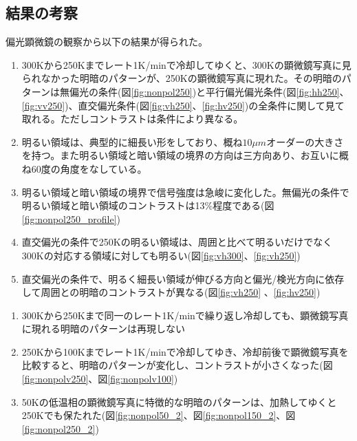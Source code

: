 \subsection{結果の考察}
偏光顕微鏡の観察から以下の結果が得られた。
\begin{description}
\item[300Kと250Kの偏光顕微鏡像の比較]
\item
\begin{enumerate}
\item 300Kから250Kまでレート1K/minで冷却してゆくと、300Kの顕微鏡写真に見られなかった明暗のパターンが、250Kの顕微鏡写真に現れた。その明暗のパターンは無偏光の条件(図\ref{fig:nonpol250})と平行偏光偏光条件(図\ref{fig:hh250}、\ref{fig:vv250})、直交偏光条件(図\ref{fig:vh250}、\ref{fig:hv250})の全条件に関して見て取れる。ただしコントラストは条件により異なる。
\item 明るい領域は、典型的に細長い形をしており、概ね$10 \mu m$オーダーの大きさを持つ。また明るい領域と暗い領域の境界の方向は三方向あり、お互いに概ね60度の角度をなしている。
\item 明るい領域と暗い領域の境界で信号強度は急峻に変化した。無偏光の条件で明るい領域と暗い領域のコントラストは13\%程度である(図\ref{fig:nonpol250_profile})
\item 直交偏光の条件で250Kの明るい領域は、周囲と比べて明るいだけでなく300Kの対応する領域に対しても明るい(図\ref{fig:vh300}、\ref{fig:vh250})
\item 直交偏光の条件で、明るく細長い領域が伸びる方向と偏光/検光方向に依存して周囲との明暗のコントラストが異なる(図\ref{fig:vh250} 、\ref{fig:hv250})
 \end{enumerate}
\item[250Kと50Kの偏光顕微鏡像の比較]
\item 
\begin{enumerate}
\item 300Kから250Kまで同一のレート1K/minで繰り返し冷却しても、顕微鏡写真に現れる明暗のパターンは再現しない
\item 250Kから100Kまでレート1K/minで冷却してゆき、冷却前後で顕微鏡写真を比較すると、明暗のパターンが変化し、コントラストが小さくなった(図\ref{fig:nonpolv250}、図\ref{fig:nonpolv100})
\item 50Kの低温相の顕微鏡写真に特徴的な明暗のパターンは、加熱してゆくと250Kでも保たれた(図\ref{fig:nonpol50_2}、図\ref{fig:nonpol150_2}、図\ref{fig:nonpol250_2})
 \end{enumerate}
 \end{description}
 
